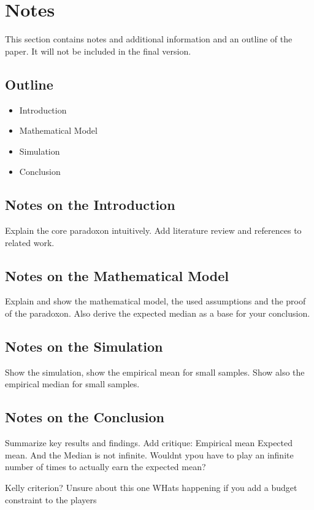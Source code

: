 \section{Notes}
This section contains notes and additional information and an outline of the paper. It will not be included in the final version.

\subsection{Outline}
\begin{itemize}
    \item Introduction
    \item Mathematical Model
    \item Simulation
    \item Conclusion
\end{itemize}

\subsection{Notes on the Introduction}
Explain the core paradoxon intuitively.
Add literature review and references to related work.

\subsection{Notes on the Mathematical Model}
Explain and show the mathematical model, the used assumptions and the proof of the paradoxon.
Also derive the expected median as a base for your conclusion.

\subsection{Notes on the Simulation}
Show the simulation, show the empirical mean for small samples.
Show also the empirical median for small samples.

\subsection{Notes on the Conclusion}
Summarize key results and findings. Add critique: Empirical mean \neq Expected mean. And the Median is not infinite.
Wouldnt ypou have to play an infinite number of times to actually earn the expected mean?

Kelly criterion? Unsure about this one
WHats happening if you add a budget constraint to the players


